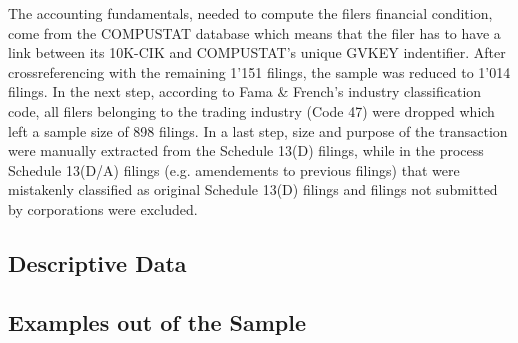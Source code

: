 \documentclass[12pt]{article}
\begin{document}
The accounting fundamentals, needed to compute the filers financial condition, come from the COMPUSTAT database which means that the filer has to have a link between its 10K-CIK and COMPUSTAT's unique GVKEY indentifier. After crossreferencing with the remaining 1'151 filings, the sample was reduced to 1'014 filings. In the next step, according to Fama \& French's industry classification code, all filers belonging to the trading industry (Code 47) were dropped which left a sample size of 898 filings. In a last step, size and purpose of the transaction were manually extracted from the Schedule 13(D) filings, while in the process Schedule 13(D/A) filings (e.g. amendements to previous filings) that were mistakenly classified as original Schedule 13(D) filings and filings not submitted by corporations were excluded.

\subsection{Descriptive Data}
\subsection{Examples out of the Sample}
\end{document}
